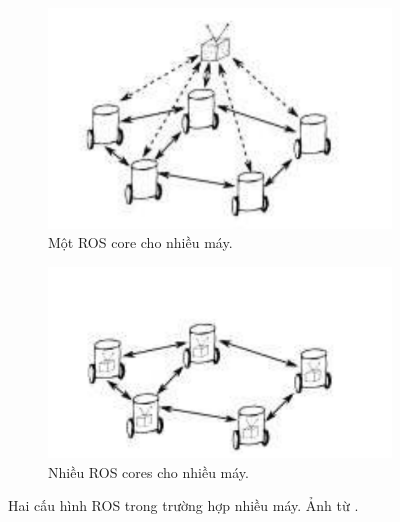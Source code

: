 \documentclass[11pt,openany]{book}
\begin{document}
\begin{figure}[H]
    \centering
    \begin{subfigure}[H]{0.4\linewidth}
        \includegraphics[width=\linewidth]{assets/4_8_a.png}
        \caption{{Một ROS core cho nhiều máy.}}
        \label{fig:4.8a}
    \end{subfigure}
    \begin{subfigure}[H]{0.4\linewidth}
        \includegraphics[width=\linewidth]{assets/4_8_b.png}
        \caption{{Nhiều ROS cores cho nhiều máy.}}
        \label{fig:4.8b}
    \end{subfigure}
    \caption{{Hai cấu hình ROS trong trường hợp nhiều máy. Ảnh từ \cite{andre2014coordinated}.}}
    \label{fig:4.8}
\end{figure}
\end{document}
